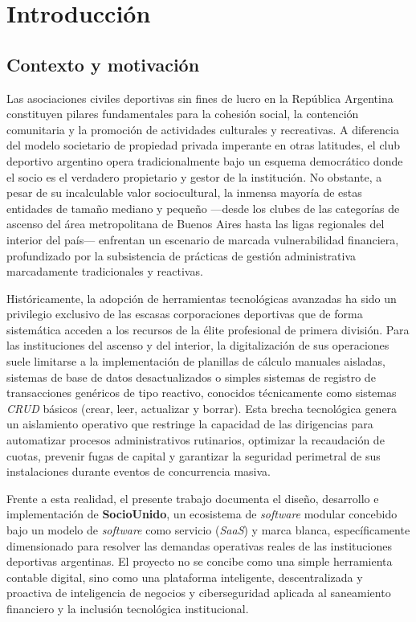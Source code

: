 \documentclass[conference, a4paper]{IEEEtran}
\begin{document}
\section{Introducci\'on}

\subsection{Contexto y motivaci\'on}
Las asociaciones civiles deportivas sin fines de lucro en la Rep\'ublica Argentina constituyen pilares fundamentales para la cohesi\'on social, la contenci\'on comunitaria y la promoci\'on de actividades culturales y recreativas. A diferencia del modelo societario de propiedad privada imperante en otras latitudes, el club deportivo argentino opera tradicionalmente bajo un esquema democr\'atico donde el socio es el verdadero propietario y gestor de la instituci\'on. No obstante, a pesar de su incalculable valor sociocultural, la inmensa mayor\'ia de estas entidades de tama\~no mediano y peque\~no ---desde los clubes de las categor\'ias de ascenso del \'area metropolitana de Buenos Aires hasta las ligas regionales del interior del pa\'is--- enfrentan un escenario de marcada vulnerabilidad financiera, profundizado por la subsistencia de pr\'acticas de gesti\'on administrativa marcadamente tradicionales y reactivas.

Hist\'oricamente, la adopci\'on de herramientas tecnol\'ogicas avanzadas ha sido un privilegio exclusivo de las escasas corporaciones deportivas que de forma sistem\'atica acceden a los recursos de la \'elite profesional de primera divisi\'on. Para las instituciones del ascenso y del interior, la digitalizaci\'on de sus operaciones suele limitarse a la implementaci\'on de planillas de c\'alculo manuales aisladas, sistemas de base de datos desactualizados o simples sistemas de registro de transacciones gen\'ericos de tipo reactivo, conocidos t\'ecnicamente como sistemas \textit{CRUD} b\'asicos (crear, leer, actualizar y borrar). Esta brecha tecnol\'ogica genera un aislamiento operativo que restringe la capacidad de las dirigencias para automatizar procesos administrativos rutinarios, optimizar la recaudaci\'on de cuotas, prevenir fugas de capital y garantizar la seguridad perimetral de sus instalaciones durante eventos de concurrencia masiva.

Frente a esta realidad, el presente trabajo documenta el dise\~no, desarrollo e implementaci\'on de \textbf{SocioUnido}, un ecosistema de \textit{software} modular concebido bajo un modelo de \textit{software} como servicio (\textit{SaaS}) y marca blanca, espec\'ificamente dimensionado para resolver las demandas operativas reales de las instituciones deportivas argentinas. El proyecto no se concibe como una simple herramienta contable digital, sino como una plataforma inteligente, descentralizada y proactiva de inteligencia de negocios y ciberseguridad aplicada al saneamiento financiero y la inclusi\'on tecnol\'ogica institucional.
\end{document}
